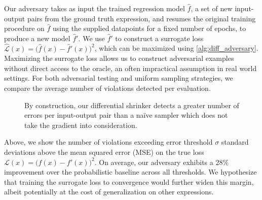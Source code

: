Our adversary takes as input the trained regression model $\hat{f}$, a set of new input-output pairs from the ground truth expression, and resumes the original training procedure on $\hat{f}$ using the supplied datapoints for a fixed number of epochs, to produce a new model $\hat{f}'$. We use $\hat{f}'$ to construct a surrogate loss $\hat{\mathcal{L}}(x) = \big(\hat{f}(x) - \hat{f}'(x)\big)^2$, which can be maximized using \autoref{alg:diff_adversary}. Maximizing the surrogate loss allows us to construct adversarial examples without direct access to the oracle, an often impractical assumption in real world settings. For both adversarial testing and uniform sampling strategies, we compare the average number of violations detected per evaluation.

\begin{figure}[H]
\caption{By construction, our differential shrinker detects a greater number of errors per input-output pair than a na\"ive sampler which does not take the gradient into consideration.}
\label{fig:pbt_comparison}
\end{figure}

Above, we show the number of violations exceeding error threshold $\sigma$ standard deviations above the mean squared error (MSE) on the true loss $\mathcal{L}(x) = \big(f(x) - f'(x)\big)^2$. On average, our adversary exhibits a $28\%$ improvement over the probabilistic baseline across all thresholds. We hypothesize that training the surrogate loss to convergence would further widen this margin, albeit potentially at the cost of generalization on other expressions.

